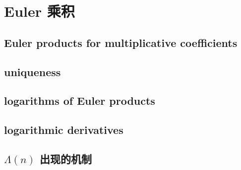 \section{Euler 乘积}
\label{b3:sec:2505}


\subsection{Euler products for multiplicative coefficients}
\label{b3:subsec:250501}

\subsection{uniqueness}
\label{b3:subsec:250502}

\subsection{logarithms of Euler products}
\label{b3:subsec:250503}

\subsection{logarithmic derivatives}
\label{b3:subsec:250504}

\subsection{\texorpdfstring{\(\Lambda(n)\)}{(n)} 出现的机制}
\label{b3:subsec:250505}


